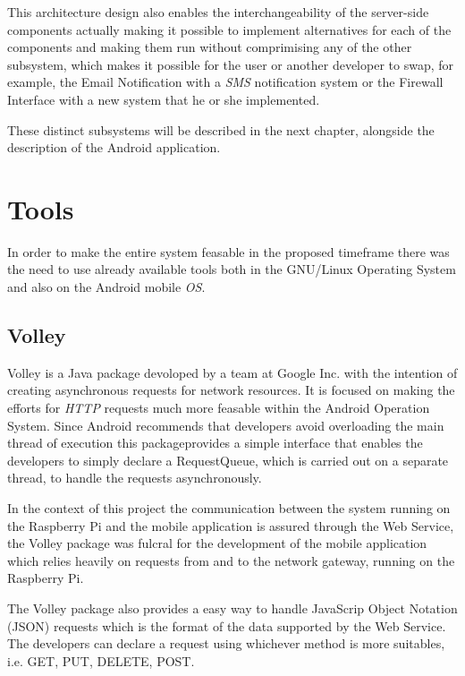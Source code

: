 This architecture design also enables the interchangeability of the server-side
components actually making it possible to implement alternatives for each of the
components and making them run without comprimising any of the other subsystem,
which makes it possible for the user or another developer to swap, for example,
the Email Notification with a \emph{\ac{SMS}} notification system
or the Firewall Interface with a new system that he or she implemented.

These distinct subsystems will be described in the next chapter, alongside the
description of the Android application.


\section{Tools}
\label{chap3:sec:tools}
In order to make the entire system feasable in the proposed timeframe there was
the need to use already available tools both in the GNU/Linux Operating System
and also on the Android mobile \emph{\ac{OS}}.

\subsection{Volley}
\label{chap3:sec:tools:sub:volley}
Volley is a Java package devoloped by a team at Google Inc. with the intention
of creating asynchronous requests for network resources. It is focused on making
the efforts for \emph{\ac{HTTP}} requests much more feasable
within the Android Operation System. Since Android recommends that developers
avoid overloading the main thread of execution this packageprovides a simple
interface that enables the developers to simply declare a RequestQueue, which is
carried out on a separate thread, to handle the requests asynchronously.

In the context of this project the communication between the system running on
the Raspberry Pi and the mobile application is assured through the Web Service,
the Volley package was fulcral for the development of the mobile application
which relies heavily on requests from and to the network gateway, running on the
Raspberry Pi.

The Volley package also provides a easy way to handle JavaScrip Object Notation
(JSON) requests which is the format of the data supported by the Web Service.
The developers can declare a  request using whichever
 method is more suitables, i.e. GET, PUT, DELETE, POST.

